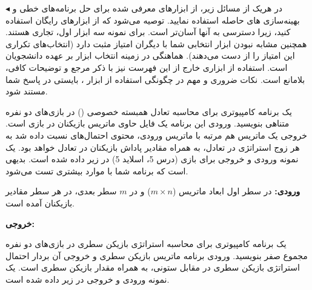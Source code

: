 \documentclass[12pt]{exam}
\theoremstyle{plain}
\theoremstyle{definition}
\theoremstyle{remark}
\begin{document}
\begin{questions}
\begin{mybox3}{}
\begin{latin}
\begin{enumerate}[label*=\arabic*.]
    \end{enumerate}
 \end{latin}

$ \blacktriangleleft$
در هریک از مسائل زیر، از ابزارهای معرفی شده برای حل برنامه‌های خطی و بهینه‌سازی ‌های حاصله استفاده نمایید. توصیه می‌شود که از ابزارهای رایگان استفاده کنید، زیرا دسترسی به آنها آسان‌تر است. برای نمونه سه ابزار اول، تجاری هستند. همچنین مشابه نبودن ابزار انتخابی شما با دیگران امتیاز مثبت دارد (انتخاب‌های تکراری این امتیاز را از دست می‌دهند). هماهنگی در زمینه انتخاب ابزار بر عهده دانشجویان است. استفاده از ابزاری خارج از این فهرست نیز با ذکر مرجع و توضیحات کافی، بلامانع است. نکات ضروری و مهم در چگونگی استفاده از ابزار ، بایستی در پاسخ شما مستند شود.

\end{mybox3}


\question

یک برنامه کامپیوتری برای محاسبه تعادل همبسته خصوصی
()
 در بازی‌های دو نفره متناهی بنویسید. ورودی این برنامه یک فایل حاوی ماتریس 
 بازیکنان در بازی است. خروجی یک ماتریس هم مرتبه با ماتریس ورودی، محتوی احتمال‌های نسبت‌ داده شد به هر  زوج استراتژی در تعادل، به همراه مقادیر پاداش بازیکنان در تعادل خواهد بود. یک نمونه ورودی و خروجی برای بازی 
 (درس 5، اسلاید 5) در زیر داده شده است. بدیهی است که برنامه شما با موارد بیشتری تست می‌شود.
 
\textbf{ ورودی: }
 در سطر اول ابعاد ماتریس ($m\times n$) و در $m$ سطر بعدی، در هر سطر مقادیر 
 بازیکنان آمده است.
 
 \begin{latin}
     \singlespacing
     
     \doublespacing
 \end{latin}

\textbf{خروجی: }

 \begin{latin}
    \singlespacing
    
    \doublespacing
\end{latin}


\question
یک برنامه کامپیوتری برای محاسبه استراتژی 
بازیکن سطری در بازی‌های دو نفره مجموع صفر بنویسید. ورودی برنامه ماتریس 
 بازیکن سطری و خروجی آن بردار احتمال استراتژی 
  بازیکن سطری در مقابل ستونی، به همراه مقدار 
  بازیکن سطری است. یک نمونه ورودی و خروجی در زیر داده شده است.


\end{questions}
\end{document}
